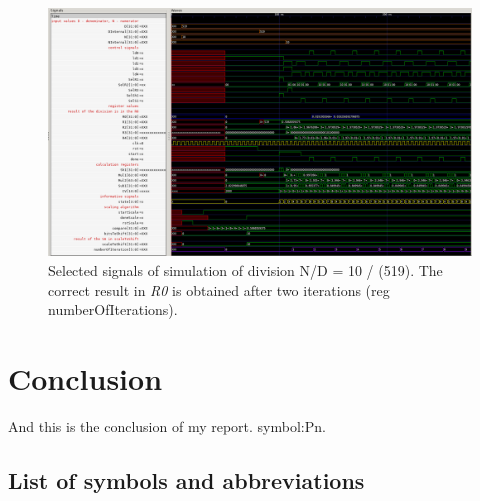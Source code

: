 \documentclass[a4paper, twoside, 11pt]{article}
\newcommand{\fbar}{\FloatBarrier}
\begin{document}
\begin{figure}[htbp!]
  \centering
  \includegraphics[width=1\textwidth]{src/png/division-10-div-519.png}
    \caption{Selected signals of simulation of division N/D = 10 / (519). The correct result in \textit{R0} is obtained after two iterations (reg numberOfIterations).}
  \label{fig:division-10-div-519}
\end{figure}


\newpage
{} 
\section*{Conclusion}
And this is the conclusion of my report. \gls{symbol:Pn}.

\flushbottom %


\newpage
\setmonofont{Times New Roman}
\printbibliography[title={{References}}]	
\nocite{*}
\setmonofont{CourierPrime-Regular}
	\appendix
	\begin{appendices}
	\section{List of symbols and abbreviations}

		\printglossary[type=abbreviationslist, style = myStyleAbbreviations]

		\fbar
		\newpage
		\printglossary[type=symbolslist, style =  myStyleSymbols]

	\end{appendices}
\end{document}
